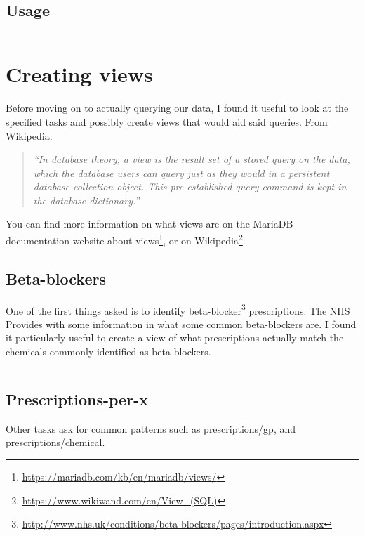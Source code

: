 \documentclass[english,a4paper,]{report}
\renewcommand{\href}[2]{#2\footnote{\url{#1}}}
\begin{document}
\subsection{Usage}\label{usage}

\inputminted[firstline=55,lastline=97]{sql}{src/sql/00-setup.sql}

\section{Creating views}\label{creating-views}

Before moving on to actually querying our data, I found it useful to
look at the specified tasks and possibly create views that would aid
said queries. From Wikipedia:

\begin{quote}
\emph{``In database theory, a view is the result set of a stored query
on the data, which the database users can query just as they would in a
persistent database collection object. This pre-established query
command is kept in the database dictionary.''}
\end{quote}

You can find more information on what views are on the MariaDB
documentation website
\href{https://mariadb.com/kb/en/mariadb/views/}{about views}, or on
\href{https://www.wikiwand.com/en/View_(SQL)}{Wikipedia}.

\subsection{Beta-blockers}\label{beta-blockers}

One of the first things asked is to identify
\href{http://www.nhs.uk/conditions/beta-blockers/pages/introduction.aspx}{beta-blocker}
prescriptions. The NHS Provides with some information in what some
common beta-blockers are. I found it particularly useful to create a
view of what prescriptions actually match the chemicals commonly
identified as beta-blockers.

\inputminted[firstline=4,lastline=23]{sql}{src/sql/01-views.sql}

\subsection{Prescriptions-per-x}\label{prescriptions-per-x}

Other tasks ask for common patterns such as prescriptions/gp, and
prescriptions/chemical.
\end{document}
